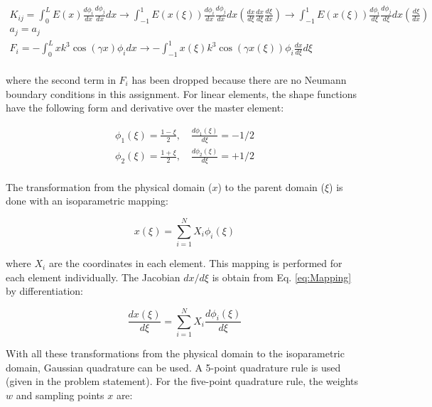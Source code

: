 \documentclass[10pt]{article}
\begin{document}
\begin{equation}
\label{eq:GoverningEqnsIsoparametric}
\begin{aligned}
K_{ij}=\int_{0}^{L}E(x)\frac{d\phi_i}{dx}\frac{d\phi_j}{dx}dx\rightarrow\int_{-1}^{1}E(x(\xi))\frac{d\phi_i}{dx}\frac{d\phi_j}{dx}dx\left(\frac{dx}{d\xi}\frac{dx}{d\xi}\frac{d\xi}{dx}\right)\rightarrow\int_{-1}^{1}E(x(\xi))\frac{d\phi_i}{d\xi}\frac{d\phi_j}{d\xi}dx\left(\frac{d\xi}{dx}\right)\\
a_j=a_j\\
F_i=-\int_{0}^{L}xk^3\cos{(\gamma x)}\phi_idx\rightarrow-\int_{-1}^{1}x(\xi)k^3\cos{(\gamma x(\xi))}\phi_i\frac{dx}{d\xi}d\xi\\
\end{aligned}
\end{equation} 

where the second term in \(F_i\) has been dropped because there are no Neumann boundary conditions in this assignment. For linear elements, the shape functions have the following form and derivative over the master element:

\begin{equation}
\begin{aligned}
\phi_1(\xi)=\frac{1-\xi}{2},\quad\frac{d\phi_1(\xi)}{d\xi}=-1/2\\
\phi_2(\xi)=\frac{1+\xi}{2}, \quad\frac{d\phi_2(\xi)}{d\xi}=+1/2\\
\end{aligned}
\end{equation}

The transformation from the physical domain (\(x\)) to the parent domain (\(\xi\)) is done with an isoparametric mapping:

\begin{equation}
\label{eq:Mapping}
x(\xi)=\sum_{i=1}^{N} X_i\phi_i(\xi)
\end{equation}

where \(X_i\) are the coordinates in each element. This mapping is performed for each element individually. The Jacobian \(dx/d\xi\) is obtain from Eq. \eqref{eq:Mapping} by differentiation:

\begin{equation}
\frac{dx(\xi)}{d\xi}=\sum_{i=1}^{N} X_i\frac{d\phi_i(\xi)}{d\xi}
\end{equation}

With all these transformations from the physical domain to the isoparametric domain, Gaussian quadrature can be used. A 5-point quadrature rule is used (given in the problem statement). For the five-point quadrature rule, the weights \(w\) and sampling points \(x\) are:
\end{document}
